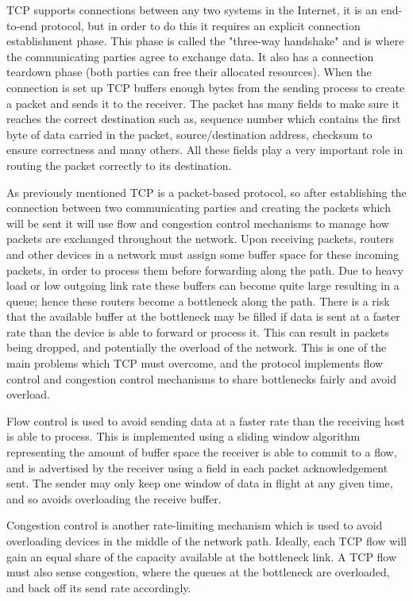 TCP supports connections between any two systems in the Internet, it is an
end-to-end protocol, but in order to do this it requires an explicit connection
establishment phase. This phase is called the "three-way handshake" and is where
the communicating parties agree to exchange data. It also has a connection
teardown phase (both parties can free their allocated resources). When the
connection is set up TCP buffers enough bytes from the sending process to create
a packet and sends it to the receiver. The packet has many fields to make sure
it reaches the correct destination such as, sequence number which contains the
first byte of data carried in the packet, source/destination address, checksum
to ensure correctness and many others. All these fields play a very important
role in routing the packet correctly to its destination.

As previously mentioned TCP is a packet-based protocol, so after establishing
the connection between two communicating parties and creating the packets which
will be sent it will use flow and congestion control mechanisms to manage how
packets are exchanged throughout the network. Upon receiving packets, routers
and other devices in a network must assign some buffer space for these incoming
packets, in order to process them before forwarding along the path. Due to heavy
load or low outgoing link rate these buffers can become quite large resulting in
a queue; hence these routers become a bottleneck along the path. There is a risk
that the available buffer at the bottleneck may be filled if data is sent at a
faster rate than the device is able to forward or process it. This can result in
packets being dropped, and potentially the overload of the network. This is one
of the main problems which TCP must overcome, and the protocol implements flow
control and congestion control mechanisms to share bottlenecks fairly and avoid
overload.

Flow control is used to avoid sending data at a faster rate than the receiving
host is able to process. This is implemented using a sliding window algorithm
representing the amount of buffer space the receiver is able to commit to a
flow, and is advertised by the receiver using a field in each packet
acknowledgement sent. The sender may only keep one window of data in flight at
any given time, and so avoids overloading the receive buffer.

Congestion control is another rate-limiting mechanism which is used to avoid
overloading devices in the middle of the network path. Ideally, each TCP flow
will gain an equal share of the capacity available at the bottleneck link. A TCP
flow must also sense congestion, where the queues at the bottleneck are
overloaded, and back off its send rate accordingly.

